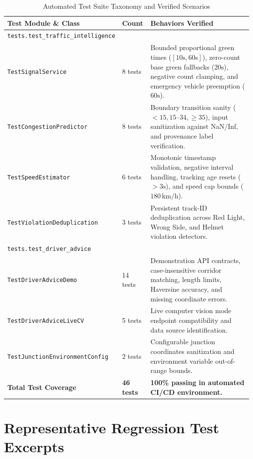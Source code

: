 \begin{table}[h!]
\centering
\small
\begin{tabularx}{\textwidth}{p{4.5cm} p{2cm} X}
\toprule
\textbf{Test Module \& Class} & \textbf{Count} & \textbf{Behaviors Verified} \\
\midrule
\texttt{tests.test\_traffic\_intelligence} & & \\
\quad \texttt{TestSignalService} & 8 tests & Bounded proportional green times ($[10\text{s}, 60\text{s}]$), zero-count base green fallbacks ($20\text{s}$), negative count clamping, and emergency vehicle preemption ($60\text{s}$). \\
\quad \texttt{TestCongestionPredictor} & 8 tests & Boundary transition sanity ($<15, 15\text{--}34, \ge 35$), input sanitization against NaN/Inf, and provenance label verification. \\
\quad \texttt{TestSpeedEstimator} & 6 tests & Monotonic timestamp validation, negative interval handling, tracking age resets ($>3\text{s}$), and speed cap bounds ($180\,\text{km/h}$). \\
\quad \texttt{TestViolationDeduplication} & 3 tests & Persistent track-ID deduplication across Red Light, Wrong Side, and Helmet violation detectors. \\
\midrule
\texttt{tests.test\_driver\_advice} & & \\
\quad \texttt{TestDriverAdviceDemo} & 14 tests & Demonstration API contracts, case-insensitive corridor matching, length limits, Haversine accuracy, and missing coordinate errors. \\
\quad \texttt{TestDriverAdviceLiveCV} & 5 tests & Live computer vision mode endpoint compatibility and data source identification. \\
\quad \texttt{TestJunctionEnvironmentConfig} & 2 tests & Configurable junction coordinates sanitization and environment variable out-of-range bounds. \\
\midrule
\textbf{Total Test Coverage} & \textbf{46 tests} & \textbf{100\% passing in automated CI/CD environment.} \\
\bottomrule
\end{tabularx}
\caption{Automated Test Suite Taxonomy and Verified Scenarios}
\label{tab:test_taxonomy}
\end{table}

\section{Representative Regression Test Excerpts}

